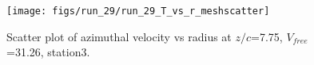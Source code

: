\begin{figure}[H]
\centering
\texttt{[image: figs/run\_29/run\_29\_T\_vs\_r\_meshscatter]}
\caption{Scatter plot of azimuthal velocity vs radius at $z/c$=7.75, $V_{free}$=31.26, station3.}
\label{fig:run_29_T_vs_r_meshscatter}
\end{figure}


